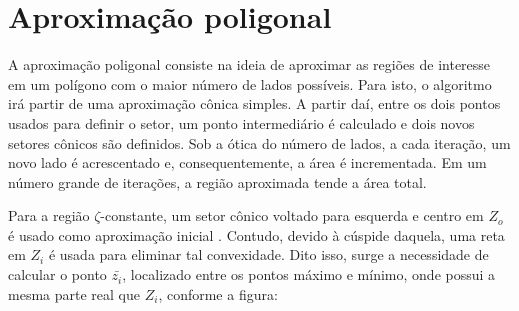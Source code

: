 \section{Aproximação poligonal}
A aproximação poligonal consiste na ideia de aproximar as regiões de interesse em um polígono com o maior número de lados possíveis. Para isto, o algoritmo irá partir de uma aproximação cônica simples. A partir daí, entre os dois pontos usados para definir o setor, um ponto intermediário é calculado e dois novos setores cônicos são definidos.
Sob a ótica do número de lados, a cada iteração, um novo lado é acrescentado e, consequentemente, a área é incrementada. Em um número grande de iterações, a região aproximada tende a área total.

Para a região $\zeta$-constante, um setor cônico voltado para esquerda e centro em $Z_o$ é usado como aproximação inicial \cite{WISNIEWSKI2019}. Contudo, devido à cúspide daquela, uma reta em $Z_i$ é usada para eliminar tal convexidade. Dito isso, surge a necessidade de calcular o ponto $\bar{z_i}$, localizado entre os pontos máximo e mínimo, onde possui a mesma parte real que $Z_i$, conforme a figura:

